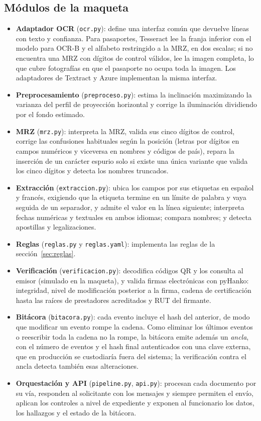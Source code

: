 \documentclass[11pt,a4paper]{article}
\begin{document}
\subsection{Módulos de la maqueta}
\begin{itemize}
  \item \textbf{Adaptador OCR} (\texttt{ocr.py}): define una interfaz común que devuelve líneas con texto y confianza. Para pasaportes, Tesseract lee la franja inferior con el modelo para OCR-B y el alfabeto restringido a la MRZ, en dos escalas; si no encuentra una MRZ con dígitos de control válidos, lee la imagen completa, lo que cubre fotografías en que el pasaporte no ocupa toda la imagen. Los adaptadores de Textract y Azure implementan la misma interfaz.
  \item \textbf{Preprocesamiento} (\texttt{preproceso.py}): estima la inclinación maximizando la varianza del perfil de proyección horizontal y corrige la iluminación dividiendo por el fondo estimado.
  \item \textbf{MRZ} (\texttt{mrz.py}): interpreta la MRZ, valida sus cinco dígitos de control, corrige las confusiones habituales según la posición (letras por dígitos en campos numéricos y viceversa en nombres y códigos de país), repara la inserción de un carácter espurio solo si existe una única variante que valida los cinco dígitos y detecta los nombres truncados.
  \item \textbf{Extracción} (\texttt{extraccion.py}): ubica los campos por sus etiquetas en español y francés, exigiendo que la etiqueta termine en un límite de palabra y vaya seguida de un separador, y admite el valor en la línea siguiente; interpreta fechas numéricas y textuales en ambos idiomas; compara nombres; y detecta apostillas y legalizaciones.
  \item \textbf{Reglas} (\texttt{reglas.py} y \texttt{reglas.yaml}): implementa las reglas de la sección~\ref{sec:reglas}.
  \item \textbf{Verificación} (\texttt{verificacion.py}): decodifica códigos QR y los consulta al emisor (simulado en la maqueta), y valida firmas electrónicas con pyHanko: integridad, nivel de modificación posterior a la firma, cadena de certificación hasta las raíces de prestadores acreditados y RUT del firmante.
  \item \textbf{Bitácora} (\texttt{bitacora.py}): cada evento incluye el hash del anterior, de modo que modificar un evento rompe la cadena. Como eliminar los últimos eventos o reescribir toda la cadena no la rompe, la bitácora emite además un \emph{ancla}, con el número de eventos y el hash final autenticados con una clave externa, que en producción se custodiaría fuera del sistema; la verificación contra el ancla detecta también esas alteraciones.
  \item \textbf{Orquestación y API} (\texttt{pipeline.py}, \texttt{api.py}): procesan cada documento por su vía, responden al solicitante con los mensajes y siempre permiten el envío, aplican los controles a nivel de expediente y exponen al funcionario los datos, los hallazgos y el estado de la bitácora.
\end{itemize}
\end{document}
